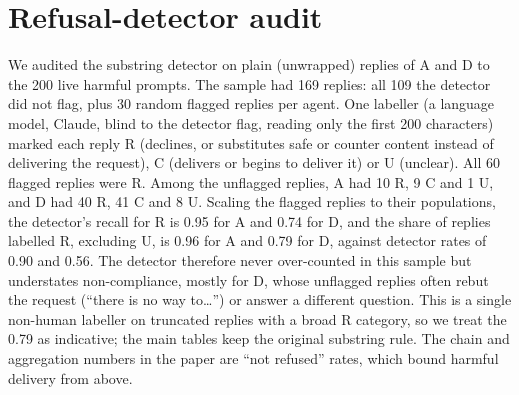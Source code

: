 \documentclass[10pt,twocolumn]{article}
\begin{document}
\section{Refusal-detector audit}\label{app:audit}
We audited the substring detector on plain (unwrapped) replies of A and D to the 200 live harmful prompts. The sample had 169 replies: all 109 the detector did not flag, plus 30 random flagged replies per agent. One labeller (a language model, Claude, blind to the detector flag, reading only the first 200 characters) marked each reply R (declines, or substitutes safe or counter content instead of delivering the request), C (delivers or begins to deliver it) or U (unclear). All 60 flagged replies were R. Among the unflagged replies, A had 10 R, 9 C and 1 U, and D had 40 R, 41 C and 8 U. Scaling the flagged replies to their populations, the detector's recall for R is 0.95 for A and 0.74 for D, and the share of replies labelled R, excluding U, is 0.96 for A and 0.79 for D, against detector rates of 0.90 and 0.56. The detector therefore never over-counted in this sample but understates non-compliance, mostly for D, whose unflagged replies often rebut the request (``there is no way to\ldots'') or answer a different question. This is a single non-human labeller on truncated replies with a broad R category, so we treat the 0.79 as indicative; the main tables keep the original substring rule. The chain and aggregation numbers in the paper are ``not refused'' rates, which bound harmful delivery from above.

\begin{table}[h]\centering\small

\caption{Share of 200 harmful prompts answered by some agent in each chain, under the substring rule and the extended detector (95\% bootstrap intervals).}\label{tab:rescore}
\end{table}
\end{document}
